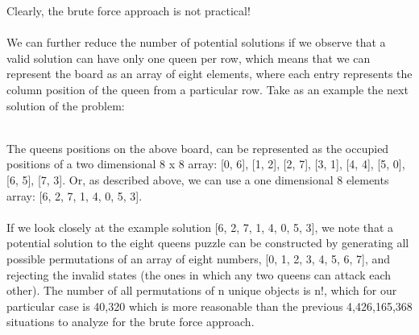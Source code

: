 \documentclass[12pt,a4paper]{article}
\begin{document}
Clearly, the brute force approach is not practical!\\
\\We can further reduce the number of potential solutions if we observe that a valid solution can have only one queen per row, which means that we can represent the board as an array of eight elements, where each entry represents the column position of the queen from a particular row. Take as an example the next solution of the problem:
\begin{figure}[!h]
	\begin{center}
	\end{center}
\end{figure}\\
The queens positions on the above board, can be represented as the occupied positions of a two dimensional 8 x 8 array: [0, 6], [1, 2], [2, 7], [3, 1], [4, 4], [5, 0], [6, 5], [7, 3]. Or, as described above, we can use a one dimensional 8 elements array: [6, 2, 7, 1, 4, 0, 5, 3].\\
\\If we look closely at the example solution [6, 2, 7, 1, 4, 0, 5, 3], we note that a potential solution to the eight queens puzzle can be constructed by generating all possible permutations of an array of eight numbers, [0, 1, 2, 3, 4, 5, 6, 7], and rejecting the invalid states (the ones in which any two queens can attack each other). The number of all permutations of n unique objects is n!, which for our particular case is 40,320 which is more reasonable than the previous 4,426,165,368 situations to analyze for the brute force approach.\\
\end{document}

